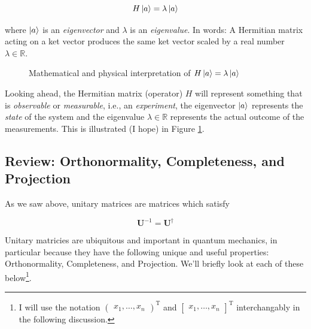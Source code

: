 \documentclass[11pt, oneside]{article}   	%
\begin{document}
\begin{equation*}
H \ket{a}= \lambda \ket{a}
\end{equation*}

\bigskip
\noindent
where $\ket{a}$ is an \emph{eigenvector} and $\lambda$ is an \emph{eigenvalue}.  In words: A Hermitian matrix acting
on a ket vector produces the same ket vector scaled by a real number $\lambda \in \mathbb{R}$.

\begin{figure}[H]
\caption{Mathematical and physical interpretation of $H \ket{a} = \lambda \ket{a}$}
\label{fig:math_physics}
\end{figure}


\bigskip
\noindent
Looking ahead, the Hermitian matrix (operator) $H$ will represent something that is \emph{observable} or \emph{measurable}, i.e.,  an \emph{experiment}, 
the eigenvector $\ket{a}$ represents the \emph{state} of the system and the eigenvalue $\lambda \in \mathbb{R}$ represents the actual outcome of the 
measurements. This is illustrated (I hope) in Figure \ref{fig:math_physics}.

\subsection{Review: Orthonormality, Completeness, and Projection}
As we saw above, unitary matrices are matrices which satisfy 

\begin{equation}
\mathbf{U}^{-1} = \mathbf{U}^{\dagger}
\label{eqn:inverse}
\end{equation}

\bigskip
\noindent
Unitary matricies are ubiquitous and important in quantum mechanics, in 
particular because they have the following unique and useful properties: Orthonormality, Completeness, and Projection. We'll briefly look at each of these below\footnote{I will use the 
notation $\begin{pmatrix} x_1, \hdots, x_n \end{pmatrix}^{\text{T}}$ and $\begin{bmatrix} x_1, \hdots, x_n \end{bmatrix}^\text{T}$ interchangably in the following discussion.}.
\end{document}
